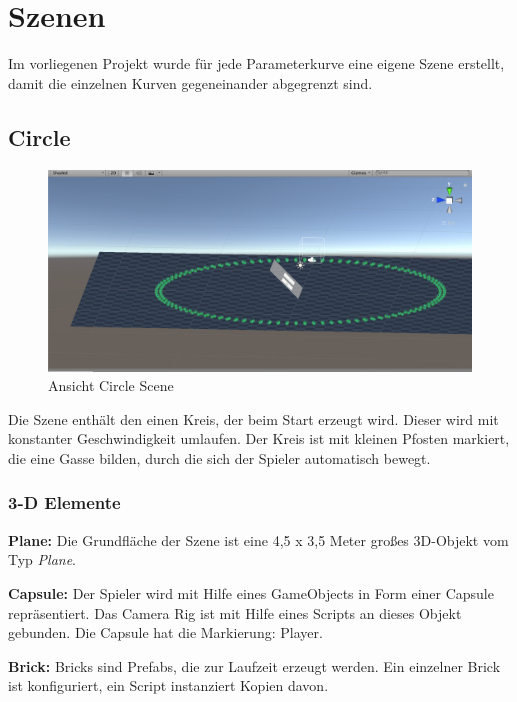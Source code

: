 
\chapter{Szenen}
\label{Szenen}

Im vorliegenen Projekt wurde für jede Parameterkurve eine eigene Szene erstellt, damit die einzelnen Kurven gegeneinander abgegrenzt sind.


\section{Circle}
\label{Kreis}

\begin{figure}[h!]
	\includegraphics[scale=0.5]{bilder/CircleScene.png}
	\caption{Ansicht Circle Scene}
\end{figure}


Die Szene enthält den einen Kreis, der beim Start erzeugt wird. Dieser wird mit konstanter Geschwindigkeit umlaufen. Der Kreis ist mit kleinen Pfosten markiert, die eine Gasse bilden, durch die sich der Spieler automatisch bewegt.



\subsection{3-D Elemente}

\textbf{Plane: } Die Grundfläche der Szene ist eine 4,5 x 3,5 Meter großes 3D-Objekt vom Typ \emph{Plane}.

\textbf{Capsule: } Der Spieler wird mit Hilfe eines GameObjects in Form einer Capsule repräsentiert. Das Camera Rig ist mit Hilfe eines Scripts an dieses Objekt gebunden. Die Capsule hat die Markierung: Player.

\textbf{Brick: } Bricks sind Prefabs, die zur Laufzeit erzeugt werden. Ein einzelner Brick ist konfiguriert, ein Script instanziert Kopien davon.

